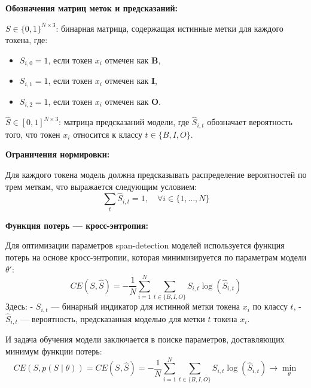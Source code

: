 \documentclass[12pt]{article}
\begin{document}
\textbf{Обозначения матриц меток и предсказаний:}

\( S \in \{0, 1\}^{N \times 3} \): бинарная матрица, содержащая истинные метки для каждого токена, где:
   \begin{itemize}
     \item \( S_{i,0} = 1 \), если токен \( x_i \) отмечен как \textbf{B},
     \item \( S_{i,1} = 1 \), если токен \( x_i \) отмечен как \textbf{I},
     \item \( S_{i,2} = 1 \), если токен \( x_i \) отмечен как \textbf{O}.
   \end{itemize}
\( \hat{S} \in [0, 1]^{N \times 3} \): матрица предсказаний модели, где \( \hat{S}_{i,t} \) обозначает вероятность того, что токен \( x_i \) относится к классу \( t \in \{ B, I, O \} \).

\textbf{Ограничения нормировки:}

   Для каждого токена модель должна предсказывать распределение вероятностей по трем меткам, что выражается следующим условием:
   $$
   \sum_t \hat{S}_{i, t} = 1, \quad \forall i \in \{1, \dots, N\}
   $$

\textbf{Функция потерь — кросс-энтропия:}

   Для оптимизации параметров span-detection моделей используется функция потерь на основе кросс-энтропии, которая минимизируется по параметрам модели \( \theta' \):
   $$
   CE(S, \hat{S}) = -\frac{1}{N} \sum_{i=1}^{N} \sum_{t \in \{B, I, O\}} S_{i, t} \log(\hat{S}_{i, t})
   $$
   Здесь:
   - \( S_{i, t} \) — бинарный индикатор для истинной метки токена \( x_i \) по классу \( t \),
   - \( \hat{S}_{i, t} \) — вероятность, предсказанная моделью для метки \( t \) токена \( x_i \).

И задача обучения модели заключается в поиске параметров, доставляющих минимум функции потерь:
$$
CE(S, p(S \mid \theta)) = CE(S, \hat{S}) = -\frac{1}{N} \sum_{i=1}^{N} \sum_{t \in \{B, I, O\}} S_{i, t} \log(\hat{S}_{i, t}) \longrightarrow \min_{\theta}
$$
\end{document}
